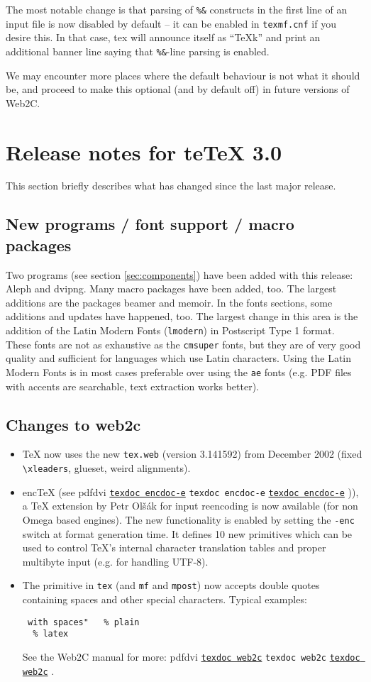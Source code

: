 \documentclass[11pt,a4paper]{article}
\newcommand{\pdfext}{pdf}
\newcommand{\dviext}{dvi}
\let\docext=\pdfext
\let\docext=\dviext
\newcommand{\dlink}[3]{%
  \ifpdf
    \ifx\pdfext#3
      \href{#1/#2.#3}{\texttt{texdoc #2}}%
    \else
      \texttt{texdoc #2}%
    \fi
  \else
     \href{#1/#2.#3}{\mbox{\texttt{texdoc #2}}}%
  \fi}
\begin{document}
The most notable change is that parsing of \verb+%&+ constructs in the
first line of an input file is now disabled by default -- it can be
enabled in \texttt{texmf.cnf} if you desire this.  In that case, tex
will announce itself as ``TeXk'' and print an additional banner line
saying
that \verb+%&+-line parsing is enabled.
  
We may encounter more places where the default behaviour is not what
it should be, and proceed to make this optional (and by default off)
in future versions of Web2C.


\section{Release notes for te\TeX{} 3.0}
This section briefly describes what has changed since the last major
release.

\subsection{New programs / font support / macro packages}
Two programs (see section \ref{sec:components}) have been added with
this release: Aleph and dvipng. Many macro packages have been added,
too.  The largest additions are the packages beamer and memoir. In the
fonts sections, some additions and updates have happened, too. The
largest change in this area is the addition of the Latin Modern Fonts
(\verb+lmodern+) in Postscript Type 1 format. These fonts are not as
exhaustive as the \verb+cmsuper+ fonts, but they are of very good
quality and sufficient for languages which use Latin characters. Using
the Latin Modern Fonts is in most cases preferable over using the
\verb+ae+ fonts (e.g. PDF files with accents are searchable, text
extraction works better).

\subsection{Changes to web2c}
\begin{itemize}
\item \TeX{} now uses the new \verb+tex.web+ (version 3.141592) from
  December 2002 (fixed \verb+\xleaders+, glueset, weird alignments).
\item enc\TeX{} (see
  \dlink{../../../texmf-dist/doc/generic/enctex}{encdoc-e}{\dviext})),
  a \TeX{} extension by Petr Ol\v s\'ak for input reencoding is now
  available (for non Omega based engines). The new functionality is
  enabled by setting the \verb+-enc+ switch at format generation time.
  It defines 10 new primitives which can be used to control \TeX{}'s
  internal character translation tables and proper multibyte input
  (e.g. for handling UTF-8).
\item The \verb++ primitive in \verb+tex+ (and \verb+mf+ and
  \verb+mpost+) now accepts double quotes containing spaces and other
  special characters.  Typical examples:
\begin{verbatim}
 with spaces"   % plain
  % latex
\end{verbatim}
See the Web2C manual for more: \dlink{../../../texmf-dist/doc/programs}{web2c}{\docext}.
\end{itemize}
\end{document}
